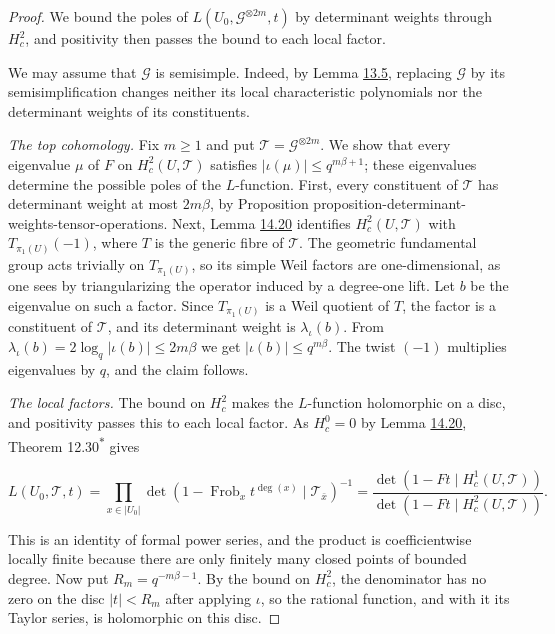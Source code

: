 \documentclass[11pt]{article}
\newcommand{\bpout}[1]{#1\textsuperscript{\hyperlink{bp-outside}{\ensuremath{\ast}}}}
\begin{document}
\begin{proof}[{Proof}]\label{bp117}%
We bound the poles of \(L(U_0,\mathcal G^{\otimes2m},t)\) by determinant weights through \(H^2_c\), and positivity then passes the bound to each local factor.

We may assume that \(\mathcal G\) is semisimple. Indeed, by Lemma \hyperref[bp19]{13.5}, replacing \(\mathcal G\) by its semisimplification changes neither its local characteristic polynomials nor the determinant weights of its constituents.

\emph{The top cohomology.} Fix \(m\ge1\) and put \(\mathcal T=\mathcal G^{\otimes2m}\). We show that every eigenvalue \(\mu\) of \(F\) on \(H_c^2(U,\mathcal T)\) satisfies \(|\iota(\mu)|\le q^{m\beta+1}\); these eigenvalues determine the possible poles of the \(L\)-function. First, every constituent of \(\mathcal T\) has determinant weight at most \(2m\beta\), by Proposition proposition-determinant-weights-tensor-operations. Next, Lemma \hyperref[bp104]{14.20} identifies \(H_c^2(U,\mathcal T)\) with \(T_{\pi_1(U)}(-1)\), where \(T\) is the generic fibre of \(\mathcal T\). The geometric fundamental group acts trivially on \(T_{\pi_1(U)}\), so its simple Weil factors are one-dimensional, as one sees by triangularizing the operator induced by a degree-one lift. Let \(b\) be the eigenvalue on such a factor. Since \(T_{\pi_1(U)}\) is a Weil quotient of \(T\), the factor is a constituent of \(\mathcal T\), and its determinant weight is \(\lambda_\iota(b)\). From \(\lambda_\iota(b)=2\log_q|\iota(b)|\le2m\beta\) we get \(|\iota(b)|\le q^{m\beta}\). The twist \((-1)\) multiplies eigenvalues by \(q\), and the claim follows.

\emph{The local factors.} The bound on \(H^2_c\) makes the \(L\)-function holomorphic on a disc, and positivity passes this to each local factor. As \(H_c^0=0\) by Lemma \hyperref[bp104]{14.20}, Theorem \bpout{12.30} gives

\[
L(U_0,\mathcal T,t)
=\prod_{x\in|U_0|}\det(1-\operatorname{Frob}_x t^{\deg(x)}\mid\mathcal T_{\bar x})^{-1}
=\frac{\det(1-Ft\mid H_c^1(U,\mathcal T))}
{\det(1-Ft\mid H_c^2(U,\mathcal T))}.
\]

This is an identity of formal power series, and the product is coefficientwise locally finite because there are only finitely many closed points of bounded degree. Now put \(R_m=q^{-m\beta-1}\). By the bound on \(H_c^2\), the denominator has no zero on the disc \(|t|<R_m\) after applying \(\iota\), so the rational function, and with it its Taylor series, is holomorphic on this disc.


\end{proof}
\end{document}
